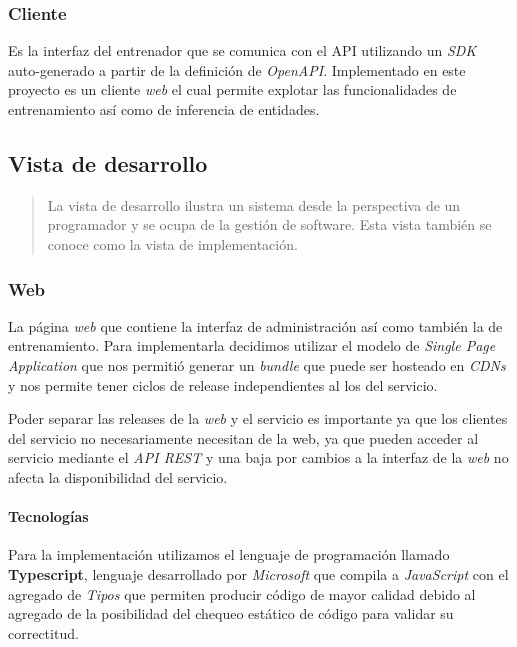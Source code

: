 \documentclass[12pt,a4paper,]{scrartcl}
\let\oldparagraph\paragraph
\renewcommand{\paragraph}[1]{\oldparagraph{#1}\mbox{}}
\begin{document}
\hypertarget{cliente}{%
\subsubsection{Cliente}\label{cliente}}

Es la interfaz del entrenador que se comunica con el API utilizando un \emph{SDK} auto-generado a partir de la definición de \emph{OpenAPI}. Implementado en este proyecto es un cliente \emph{web} el cual permite explotar las funcionalidades de entrenamiento así como de inferencia de entidades.

\hypertarget{vista-de-desarrollo}{%
\subsection{Vista de desarrollo}\label{vista-de-desarrollo}}

\begin{quote}
La vista de desarrollo ilustra un sistema desde la perspectiva de un programador y se ocupa de la gestión de software.
Esta vista también se conoce como la vista de implementación.
\end{quote}

\hypertarget{web-1}{%
\subsubsection{Web}\label{web-1}}

La página \emph{web} que contiene la interfaz de administración así como también la de entrenamiento. Para implementarla decidimos utilizar el modelo de \emph{Single Page Application} que nos permitió generar un \emph{bundle} que puede ser hosteado en \emph{CDNs} y nos permite tener ciclos de release independientes al los del servicio.

Poder separar las releases de la \emph{web} y el servicio es importante ya que los clientes del servicio no necesariamente necesitan de la web, ya que pueden acceder al servicio mediante el \emph{API REST} y una baja por cambios a la interfaz de la \emph{web} no afecta la disponibilidad del servicio.

\hypertarget{tecnologuxedas}{%
\paragraph{Tecnologías}\label{tecnologuxedas}}

Para la implementación utilizamos el lenguaje de programación llamado \textbf{Typescript}, lenguaje desarrollado por \emph{Microsoft} que compila a \emph{JavaScript} con el agregado de \emph{Tipos} que permiten producir código de mayor calidad debido al agregado de la posibilidad del chequeo estático de código para validar su correctitud.
\end{document}
